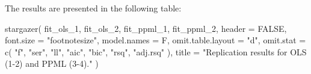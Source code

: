 \documentclass[letterpaper,twoside,12pt]{article}
\newenvironment{Shaded}{\begin{snugshade}}{\end{snugshade}}
\newcommand{\AttributeTok}[1]{\textcolor[rgb]{0.77,0.63,0.00}{#1}}
\newcommand{\ConstantTok}[1]{\textcolor[rgb]{0.00,0.00,0.00}{#1}}
\newcommand{\FunctionTok}[1]{\textcolor[rgb]{0.00,0.00,0.00}{#1}}
\newcommand{\NormalTok}[1]{#1}
\newcommand{\StringTok}[1]{\textcolor[rgb]{0.31,0.60,0.02}{#1}}
\begin{document}
The results are presented in the following table:

\begin{Shaded}
\begin{Highlighting}[]
\FunctionTok{stargazer}\NormalTok{(}
\NormalTok{  fit\_ols\_1, fit\_ols\_2, fit\_ppml\_1, fit\_ppml\_2,}
  \AttributeTok{header =} \ConstantTok{FALSE}\NormalTok{, }\AttributeTok{font.size =} \StringTok{"footnotesize"}\NormalTok{, }\AttributeTok{model.names =}\NormalTok{ F,}
  \AttributeTok{omit.table.layout =} \StringTok{"d"}\NormalTok{, }\AttributeTok{omit.stat =} \FunctionTok{c}\NormalTok{(}
    \StringTok{"f"}\NormalTok{, }\StringTok{"ser"}\NormalTok{, }\StringTok{"ll"}\NormalTok{, }\StringTok{"aic"}\NormalTok{, }\StringTok{"bic"}\NormalTok{, }\StringTok{"rsq"}\NormalTok{, }\StringTok{"adj.rsq"}
\NormalTok{  ),}
  \AttributeTok{title =} \StringTok{"Replication results for OLS (1{-}2) and}
\StringTok{  PPML (3{-}4)."}
\NormalTok{)}
\end{Highlighting}
\end{Shaded}
\end{document}
